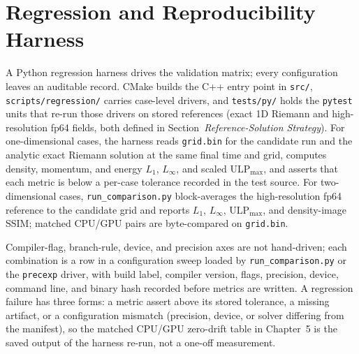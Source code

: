 \section{Regression and Reproducibility Harness}
\label{sec:ch4-regression-harness}
A Python regression harness drives the validation matrix; every configuration leaves an auditable record. CMake builds the C++
entry point in \texttt{src/}, \texttt{scripts/regression/} carries case-level
drivers, and \texttt{tests/py/} holds the \texttt{pytest} units that re-run those
drivers on stored references (exact 1D Riemann and high-resolution fp64 fields, both defined in Section~\emph{Reference-Solution Strategy}). For one-dimensional cases, the harness reads
\texttt{grid.bin} for the candidate run and the analytic exact Riemann
solution at the same final time and grid, computes density, momentum, and
energy $L_1$, $L_\infty$, and scaled $\mathrm{ULP}_{\max}$, and asserts that
each metric is below a per-case tolerance recorded in the test source. For
two-dimensional cases, \texttt{run\_comparison.py} block-averages the
high-resolution fp64 reference to the candidate grid and reports $L_1$,
$L_\infty$, $\mathrm{ULP}_{\max}$, and density-image SSIM; matched CPU/GPU pairs are
byte-compared on \texttt{grid.bin}.

Compiler-flag, branch-rule, device, and precision axes are not hand-driven;
each combination is a row in a configuration sweep loaded by
\texttt{run\_comparison.py} or the \texttt{precexp} driver, with build
label, compiler version, flags, precision, device, command line, and binary
hash recorded before metrics are written. A regression failure has three forms:
a metric assert above its stored tolerance, a missing artifact, or a
configuration mismatch (precision, device, or solver differing from the
manifest), so the matched CPU/GPU zero-drift table in
Chapter~5 is the saved output of the harness re-run, not a one-off
measurement.
